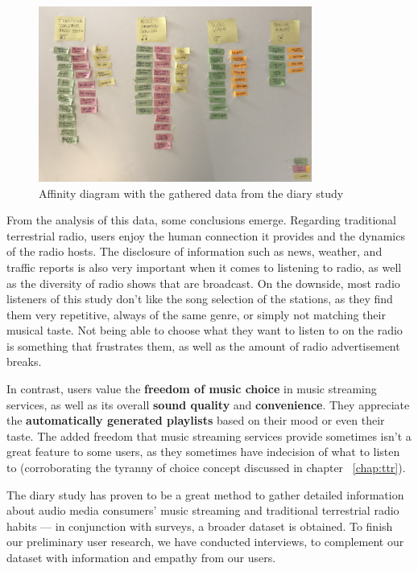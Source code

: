 \begin{figure}[h]
\centering
\includegraphics[width=0.8\textwidth]{./Images/affinitydiagram.jpg}
\caption{Affinity diagram with the gathered data from the diary study}
\label{fig:diagram1}
\end{figure}


From the analysis of this data, some conclusions emerge. Regarding traditional terrestrial radio, users enjoy the human connection it provides and the dynamics of the radio hosts. The disclosure of information such as news, weather, and traffic reports is also very important when it comes to listening to radio, as well as the diversity of radio shows that are broadcast. On the downside, most radio listeners of this study don't like the song selection of the stations, as they find them very repetitive, always of the same genre, or simply not matching their musical taste. Not being able to choose what they want to listen to on the radio is something that frustrates them, as well as the amount of radio advertisement breaks.

In contrast, users value the \textbf{freedom of music choice} in music streaming services, as well as its overall \textbf{sound quality} and \textbf{convenience}. They appreciate the \textbf{automatically generated playlists} based on their mood or even their taste. The added freedom that music streaming services provide sometimes isn't a great feature to some users, as they sometimes have indecision of what to listen to (corroborating the tyranny of choice concept discussed in chapter ~\ref{chap:ttr}). 

The diary study has proven to be a great method to gather detailed information about audio media consumers' music streaming and traditional terrestrial radio habits — in conjunction with surveys, a broader dataset is obtained. To finish our preliminary user research, we have conducted interviews, to complement our dataset with information and empathy from our users.

